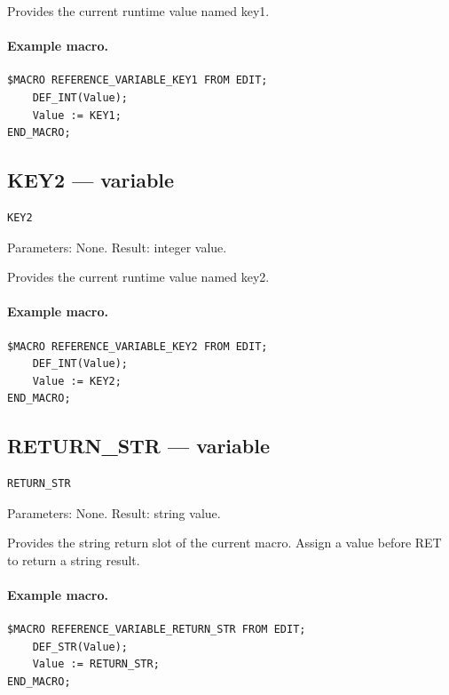 \documentclass[a4paper,10pt,twoside,openany]{book}
\begin{document}
Provides the current runtime value named key1.

\paragraph{Example macro.}
\begin{verbatim}
$MACRO REFERENCE_VARIABLE_KEY1 FROM EDIT;
    DEF_INT(Value);
    Value := KEY1;
END_MACRO;
\end{verbatim}

\label{prim:variable-key2}
\subsection*{KEY2 --- variable}
\begin{verbatim}
KEY2
\end{verbatim}
Parameters: None. Result: integer value.

Provides the current runtime value named key2.

\paragraph{Example macro.}
\begin{verbatim}
$MACRO REFERENCE_VARIABLE_KEY2 FROM EDIT;
    DEF_INT(Value);
    Value := KEY2;
END_MACRO;
\end{verbatim}

\label{prim:variable-return-str}
\subsection*{RETURN\_STR --- variable}
\begin{verbatim}
RETURN_STR
\end{verbatim}
Parameters: None. Result: string value.

Provides the string return slot of the current macro. Assign a value before RET to return a string result.

\paragraph{Example macro.}
\begin{verbatim}
$MACRO REFERENCE_VARIABLE_RETURN_STR FROM EDIT;
    DEF_STR(Value);
    Value := RETURN_STR;
END_MACRO;
\end{verbatim}
\end{document}
